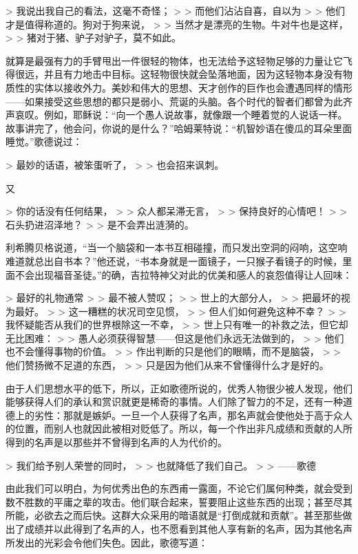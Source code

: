 \documentclass[12pt,oneside]{book}
\begin{document}
 

> 我说出我自己的看法，这毫不奇怪；
>
> 而他们沾沾自喜，自以为 
>
> 他们才是值得称道的。狗对于狗来说， 
>
> 当然才是漂亮的生物。牛对牛也是这样， 
>
> 猪对于猪、驴子对驴子，莫不如此。 

 

就算是最强有力的手臂甩出一件很轻的物体，也无法给予这轻物足够的力量让它飞得很远，并且有力地击中目标。这轻物很快就会坠落地面，因为这轻物本身没有物质性的实体以接收外力。美妙和伟大的思想、天才创作的巨作也会遭遇同样的情形——如果接受这些思想的都只是弱小、荒诞的头脑。各个时代的智者们都曾为此齐声哀叹。例如，耶稣说：“向一个愚人说故事，就像跟一个睡着觉的人说话一样。故事讲完了，他会问，你说的是什么？”哈姆莱特说：“机智妙语在傻瓜的耳朵里面睡觉。”歌德说过： 

 

> 最妙的话语，被笨蛋听了， 
>
> 也会招来讽刺。 

又 

> 你的话没有任何结果， 
>
> 众人都呆滞无言， 
>
> 保持良好的心情吧！ 
>
> 石头扔进沼泽地？
>
> 是不会弄出涟漪的。 

 

利希腾贝格说道，“当一个脑袋和一本书互相碰撞，而只发出空洞的闷响，这空响难道就总出自书本？”他还说，“书本身就是一面镜子，一只猴子看镜子的时候，里面不会出现福音圣徒。”的确，吉拉特神父对此的优美和感人的哀怨值得让人回味： 

 

> 最好的礼物通常 
>
> 最不被人赞叹； 
>
> 世上的大部分人， 
>
> 把最坏的视为最好。
>
> 这一糟糕的状况司空见惯， 
>
> 但人们如何避免这种不幸？ 
>
> 我怀疑能否从我们的世界根除这一不幸， 
>
> 世上只有唯一的补救之法，但它却无比困难： 
>
> 愚人必须获得智慧——但这是他们永远无法做到的， 
>
> 他们也不会懂得事物的价值。 
>
> 作出判断的只是他们的眼睛，而不是脑袋， 
>
> 他们赞扬微不足道的东西， 
>
> 只是因为他们从来不曾懂得什么才是好的。 

 

由于人们思想水平的低下，所以，正如歌德所说的，优秀人物很少被人发现，他们能够获得人们的承认和赏识就更是稀奇的事情。人们除了智力的不足，还有一种道德上的劣性：那就是嫉妒。一旦一个人获得了名声，那名声就会使他处于高于众人的位置，而别人也就因此被相对贬低了。所以，每一个作出非凡成绩和贡献的人所得到的名声是以那些并不曾得到名声的人为代价的。 

 

> 我们给予别人荣誉的同时， 
>
> 也就降低了我们自己。 
>
> ——歌德 

 

由此我们可以明白，为何优秀出色的东西甫一露面，不论它们属何种类，就会受到数不胜数的平庸之辈的攻击。他们联合起来，誓要阻止这些东西的出现；甚至尽其所能，必欲去之而后快。这群大众采用的暗语就是“打倒成就和贡献”。甚至那些做出了成绩并以此得到了名声的人，也不愿看到其他人享有新的名声，因为其他名声所发出的光彩会令他们失色。因此，歌德写道： 
\end{document}
